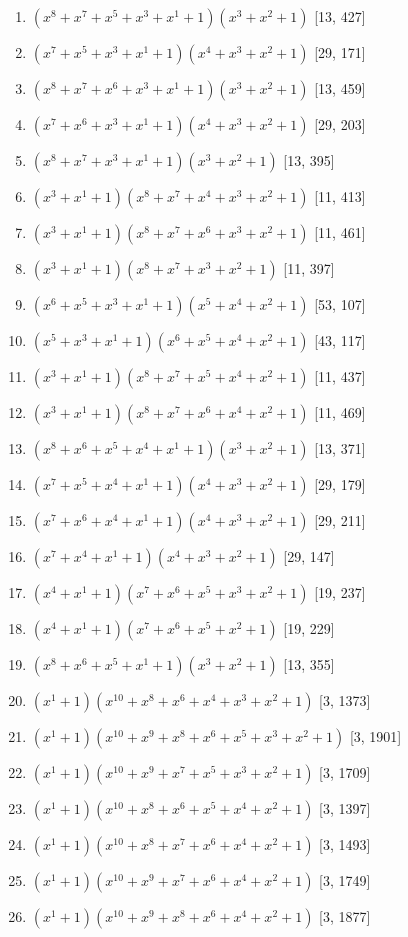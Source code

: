 \documentclass[10pt,twocolumn]{article}
\begin{document}
\begin{enumerate}
\item $(x^{8} + x^{7} + x^{5} + x^{3} + x^{1} + 1)(x^{3} + x^{2} + 1)$  [13, 427]
\item $(x^{7} + x^{5} + x^{3} + x^{1} + 1)(x^{4} + x^{3} + x^{2} + 1)$  [29, 171]
\item $(x^{8} + x^{7} + x^{6} + x^{3} + x^{1} + 1)(x^{3} + x^{2} + 1)$  [13, 459]
\item $(x^{7} + x^{6} + x^{3} + x^{1} + 1)(x^{4} + x^{3} + x^{2} + 1)$  [29, 203]
\item $(x^{8} + x^{7} + x^{3} + x^{1} + 1)(x^{3} + x^{2} + 1)$  [13, 395]
\item $(x^{3} + x^{1} + 1)(x^{8} + x^{7} + x^{4} + x^{3} + x^{2} + 1)$  [11, 413]
\item $(x^{3} + x^{1} + 1)(x^{8} + x^{7} + x^{6} + x^{3} + x^{2} + 1)$  [11, 461]
\item $(x^{3} + x^{1} + 1)(x^{8} + x^{7} + x^{3} + x^{2} + 1)$  [11, 397]
\item $(x^{6} + x^{5} + x^{3} + x^{1} + 1)(x^{5} + x^{4} + x^{2} + 1)$  [53, 107]
\item $(x^{5} + x^{3} + x^{1} + 1)(x^{6} + x^{5} + x^{4} + x^{2} + 1)$  [43, 117]
\item $(x^{3} + x^{1} + 1)(x^{8} + x^{7} + x^{5} + x^{4} + x^{2} + 1)$  [11, 437]
\item $(x^{3} + x^{1} + 1)(x^{8} + x^{7} + x^{6} + x^{4} + x^{2} + 1)$  [11, 469]
\item $(x^{8} + x^{6} + x^{5} + x^{4} + x^{1} + 1)(x^{3} + x^{2} + 1)$  [13, 371]
\item $(x^{7} + x^{5} + x^{4} + x^{1} + 1)(x^{4} + x^{3} + x^{2} + 1)$  [29, 179]
\item $(x^{7} + x^{6} + x^{4} + x^{1} + 1)(x^{4} + x^{3} + x^{2} + 1)$  [29, 211]
\item $(x^{7} + x^{4} + x^{1} + 1)(x^{4} + x^{3} + x^{2} + 1)$  [29, 147]
\item $(x^{4} + x^{1} + 1)(x^{7} + x^{6} + x^{5} + x^{3} + x^{2} + 1)$  [19, 237]
\item $(x^{4} + x^{1} + 1)(x^{7} + x^{6} + x^{5} + x^{2} + 1)$  [19, 229]
\item $(x^{8} + x^{6} + x^{5} + x^{1} + 1)(x^{3} + x^{2} + 1)$  [13, 355]
\item $(x^{1} + 1)(x^{10} + x^{8} + x^{6} + x^{4} + x^{3} + x^{2} + 1)$  [3, 1373]
\item $(x^{1} + 1)(x^{10} + x^{9} + x^{8} + x^{6} + x^{5} + x^{3} + x^{2} + 1)$  [3, 1901]
\item $(x^{1} + 1)(x^{10} + x^{9} + x^{7} + x^{5} + x^{3} + x^{2} + 1)$  [3, 1709]
\item $(x^{1} + 1)(x^{10} + x^{8} + x^{6} + x^{5} + x^{4} + x^{2} + 1)$  [3, 1397]
\item $(x^{1} + 1)(x^{10} + x^{8} + x^{7} + x^{6} + x^{4} + x^{2} + 1)$  [3, 1493]
\item $(x^{1} + 1)(x^{10} + x^{9} + x^{7} + x^{6} + x^{4} + x^{2} + 1)$  [3, 1749]
\item $(x^{1} + 1)(x^{10} + x^{9} + x^{8} + x^{6} + x^{4} + x^{2} + 1)$  [3, 1877]
\end{enumerate}
\end{document}
